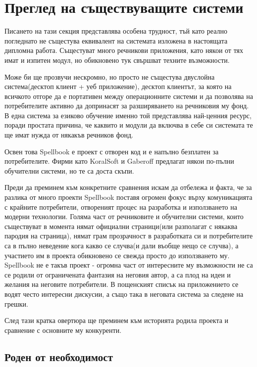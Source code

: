 \chapter{Преглед на съществуващите системи}

Писането на тази секция представлява особена трудност, тъй като реално
погледнато не същестува еквивалент на системата изложена в настоящата
дипломна работа. Същестуват много речникови приложения, като някои от
тях имат и изпитен модул, но обикновено тук свършват техните
възможности. 

Може би ще прозвучи нескромно, но просто не същестува двуслойна
система(десктоп клиент + уеб приложение), десктоп клиентът, за която
на всичкото отгоре да е портативен между операционните системи и да
позволява на потребителите активно да допринасят за разширяването на
речниковия му фонд. В една система за езиково обучение именно той
представлява най-ценния ресурс, поради простата причина, че каквито и
модули да включва в себе си системата те ще имат нужда от някакъв
речников фонд.

Освен това Spellbook е проект с отворен код и е напълно безплатен за
потребителите. Фирми като KoralSoft и Gaberoff предлагат някои
по-пълни обучителни системи, но те са доста скъпи.

Преди да преминем към конкретните сравнения искам да отбележа и факта,
че за разлика от много проекти Spellbook поставя огромен фокус върху
комуникацията с крайните потребители, отвореният процес на разработка
и използването на модерни технологии. Голяма част от речниковите и
обучителни системи, които съществуват в момента нямат официални
страници(или разполагат с някаква пародия на страница), нямат грам
прозрачност в разработката си и потребителите са в пълно неведение
кога какво се случва(и дали въобще нещо се случва), а участието им в
проекта обикновено се свежда просто до използването му. Spellbook не е
такъв проект - огромна част от интересните му възможности не са се
родили от ограничената фантазия на неговия автор, а са плод на идеи и
желания на неговите потребители. В пощенският списък на приложението
се водят често интересни дискусии, а също така в неговата система за
следене на грешки.

След тази кратка овертюра ще преминем към историята родила проекта и
сравнение с основните му конкуренти.
\section{Роден от необходимост}

